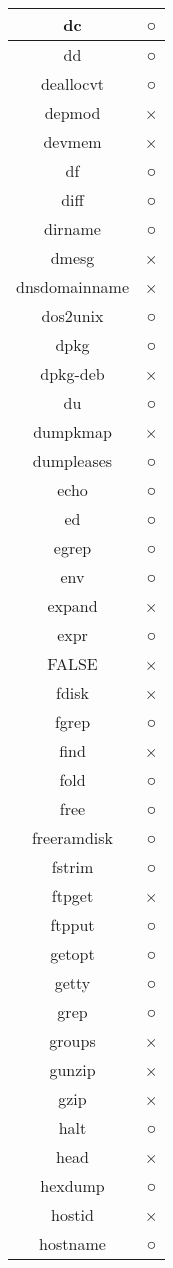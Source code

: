 \begin{longtable}{cc}
dc & ○ \\ \hline
dd & ○ \\ \hline
deallocvt & ○ \\ \hline
depmod & × \\ \hline
devmem & × \\ \hline
df & ○ \\ \hline
diff & ○ \\ \hline
dirname & ○ \\ \hline
dmesg & × \\ \hline
dnsdomainname & × \\ \hline
dos2unix & ○ \\ \hline
dpkg & ○ \\ \hline
dpkg-deb & × \\ \hline
du & ○ \\ \hline
dumpkmap & × \\ \hline
dumpleases & ○ \\ \hline
echo & ○ \\ \hline
ed & ○ \\ \hline
egrep & ○ \\ \hline
env & ○ \\ \hline
expand & × \\ \hline
expr & ○ \\ \hline
FALSE & × \\ \hline
fdisk & × \\ \hline
fgrep & ○ \\ \hline
find & × \\ \hline
fold & ○ \\ \hline
free & ○ \\ \hline
freeramdisk & ○ \\ \hline
fstrim & ○ \\ \hline
ftpget & × \\ \hline
ftpput & ○ \\ \hline
getopt & ○ \\ \hline
getty & ○ \\ \hline
grep & ○ \\ \hline
groups & × \\ \hline
gunzip & × \\ \hline
gzip & × \\ \hline
halt & ○ \\ \hline
head & × \\ \hline
hexdump & ○ \\ \hline
hostid & × \\ \hline
hostname & ○ \\ \hline

\end{longtable}
